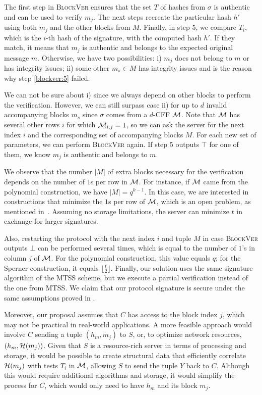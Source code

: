 \documentclass[12pt]{article}
\begin{document}
The first step in \textsc{BlockVer} ensures that the set $T$ of hashes from $\sigma$ is authentic and can be used to verify $m_j$. The next steps recreate the particular hash $h'$ using both $m_j$ and the other blocks from $M$. Finally, in step 5, we compare $T_i$, which is the $i$-th hash of the signature, with the computed hash $h'$. If they match, it means that $m_j$ is authentic and belongs to the expected original message $m$. Otherwise, we have two possibilities: i) $m_j$ does not belong to $m$ or has integrity issues; ii) some other $m_s \in M$ has integrity issues and is the reason why step \ref{blockver:5} failed.

We can not be sure about i) since we always depend on other blocks to perform the verification. However, we can still surpass case ii) for up to $d$ invalid accompanying blocks $m_s$ since $\sigma$ comes from a $d$-CFF $\mathcal{M}$. Note that $\mathcal{M}$ has several other rows $i$ for which $\mathcal{M}_{i,j} = 1$, so we can ask the server for the next index $i$ and the corresponding set of accompanying blocks $M$. For each new set of parameters, we can perform \textsc{BlockVer} again. If step 5 outputs $\top$ for one of them, we know $m_j$ is authentic and belongs to $m$.

We observe that the number $|M|$ of extra blocks necessary for the verification depends on the number of $1$s per row in $\mathcal{M}$. For instance, if $\mathcal{M}$ came from the polynomial construction, we have $|M| = q^{k-1}$. In this case, we are interested in constructions that minimize the $1$s per row of $\mathcal{M}$, which is an open problem, as mentioned in~\cite{survey-cffs}. Assuming no storage limitations, the server can minimize $t$ in exchange for larger signatures.

Also, restarting the protocol with the next index $i$ and tuple $M$ in case \textsc{BlockVer} outputs $\bot$ can be performed several times, which is equal to the number of $1$'s in column $j$ of $\mathcal{M}$. For the polynomial construction, this value equals $q$; for the Sperner construction, it equals $\lfloor \frac{t}{2} \rfloor$. Finally, our solution uses the same signature algorithm of the MTSS scheme, but we execute a partial verification instead of the one from MTSS. We claim that our protocol signature is secure under the same assumptions proved in \cite{mtss-idalino-2019}.

Moreover, our proposal assumes that $C$ has access to the block index $j$, which may not be practical in real-world applications. A more feasible approach would involve $C$ sending a tuple $(h_m, m_j)$ to $S$, or, to optimize network resources, $(h_m, \mathcal{H}(m_j))$. Given that $S$ is a resource-rich server in terms of processing and storage, it would be possible to create structural data that efficiently correlate $\mathcal{H}(m_j)$ with tests $T_i$ in $\mathcal{M}$, allowing $S$ to send the tuple $Y$ back to $C$. Although this would require additional algorithms and storage, it would simplify the process for $C$, which would only need to have $h_m$ and its block $m_j$.
\end{document}
